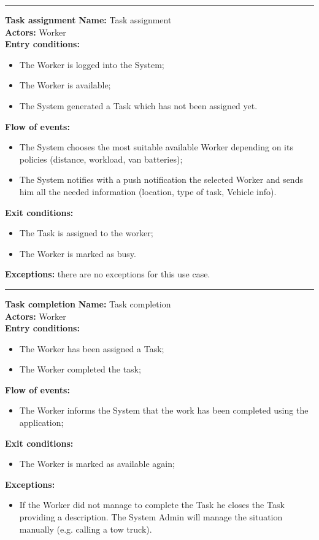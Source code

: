 \begin{center}
\noindent\rule{8cm}{1.0pt}
\end{center}


\textbf{\large Task assignment}
\bigbreak
\textbf{Name:} Task assignment\\
\textbf{Actors:} Worker \\
\textbf{Entry conditions:} 
\begin{itemize}
\item The Worker is logged into the System;
\item The Worker is available;
\item The System generated a Task which has not been assigned yet.
\end{itemize}
\textbf{Flow of events:} 
\begin{itemize}
\item The System chooses the most suitable available Worker depending on its policies (distance, workload, van batteries);
\item The System notifies with a push notification the selected Worker and sends him all the needed information (location, type of task, Vehicle info).
\end{itemize}
\textbf{Exit conditions:} 
\begin{itemize}
\item The Task is assigned to the worker;
\item The Worker is marked as busy.
\end{itemize}
\textbf{Exceptions:} there are no exceptions for this use case.\\



\begin{center}
\noindent\rule{8cm}{1.0pt}
\end{center}


\textbf{\large Task completion}
\bigbreak
\textbf{Name:} Task completion\\
\textbf{Actors:} Worker \\
\textbf{Entry conditions:} 
\begin{itemize}
\item The Worker has been assigned a Task;
\item The Worker completed the task;
\end{itemize}
\textbf{Flow of events:} 
\begin{itemize}
\item The Worker informs the System that the work has been completed using the application;
\end{itemize}
\textbf{Exit conditions:} 
\begin{itemize}
\item The Worker is marked as available again;
\end{itemize}
\textbf{Exceptions:} 
\begin{itemize}
\item If the Worker did not manage to complete the Task he closes the Task providing a description. The System Admin will manage the situation manually (e.g. calling a tow truck).
\end{itemize}


